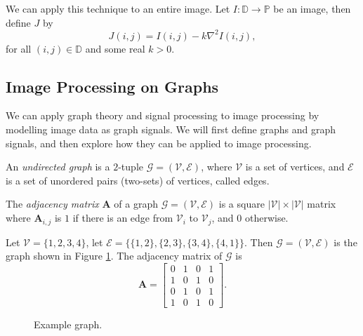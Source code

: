 We can apply this technique to an entire image. Let $I: \mathbb{D} \to \mathbb{P}$ be an image, then define $J$ by \[J(i, j) = I(i, j) - k\nabla^2I(i, j),\] for all $(i, j) \in \mathbb{D}$ and some real $k > 0$.

\subsection{Image Processing on Graphs}

We can apply graph theory and signal processing to image processing by modelling image data as graph signals. We will first define graphs and graph signals, and then explore how they can be applied to image processing.

\begin{defn}
    An \emph{undirected graph} is a $2$-tuple $\mathcal{G} = (\mathcal{V}, \mathcal{E})$, where $\mathcal{V}$ is a set of vertices, and $\mathcal{E}$ is a set of unordered pairs (two-sets) of vertices, called edges.
\end{defn}

\begin{defn}
    The \emph{adjacency matrix} $\bm{A}$ of a graph $\mathcal{G} = (\mathcal{V}, \mathcal{E})$ is a square $|\mathcal{V}| \times |\mathcal{V}|$ matrix where $\bm{A}_{i, j}$ is $1$ if there is an edge from $\mathcal{V}_i$ to $\mathcal{V}_j$, and $0$ otherwise.
\end{defn}

\begin{exmp}
    Let $\mathcal{V} = \{1, 2, 3, 4\}$, let $\mathcal{E} = \{\{1, 2\}, \{2, 3\}, \{3, 4\}, \{4, 1\}\}$. Then $\mathcal{G} = (\mathcal{V}, \mathcal{E})$ is the graph shown in Figure \ref{fig:example-graph}. The adjacency matrix of $\mathcal{G}$ is
    \[\bm{A} = \begin{bmatrix}
        0 & 1 & 0 & 1 \\
        1 & 0 & 1 & 0 \\
        0 & 1 & 0 & 1 \\
        1 & 0 & 1 & 0
    \end{bmatrix}.\]
\end{exmp}

\begin{figure}[ht!]
    \centering
\caption{Example graph.}
\label{fig:example-graph}
\end{figure}

